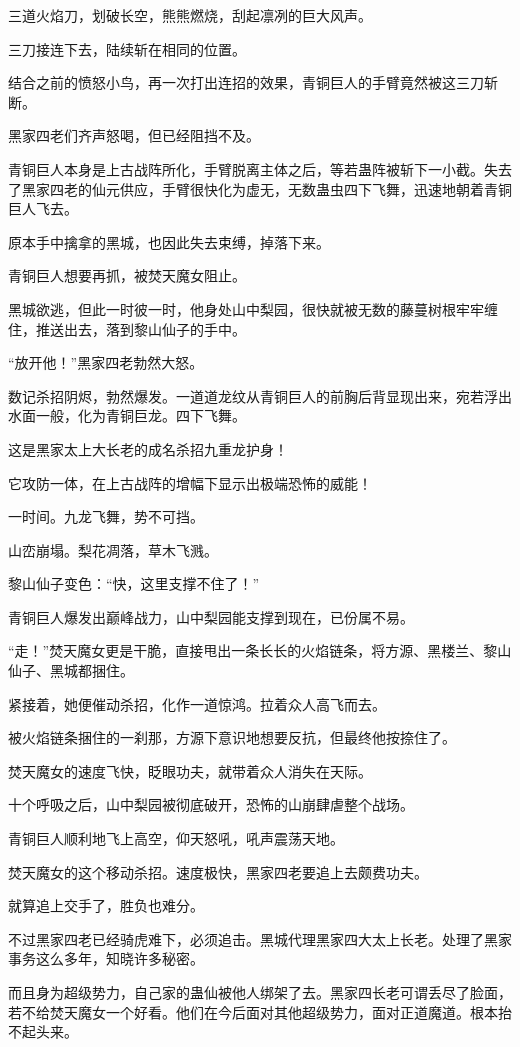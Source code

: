 \begin{this_body}
三道火焰刀，划破长空，熊熊燃烧，刮起凛冽的巨大风声。

三刀接连下去，陆续斩在相同的位置。

结合之前的愤怒小鸟，再一次打出连招的效果，青铜巨人的手臂竟然被这三刀斩断。

黑家四老们齐声怒喝，但已经阻挡不及。

青铜巨人本身是上古战阵所化，手臂脱离主体之后，等若蛊阵被斩下一小截。失去了黑家四老的仙元供应，手臂很快化为虚无，无数蛊虫四下飞舞，迅速地朝着青铜巨人飞去。

原本手中擒拿的黑城，也因此失去束缚，掉落下来。

青铜巨人想要再抓，被焚天魔女阻止。

黑城欲逃，但此一时彼一时，他身处山中梨园，很快就被无数的藤蔓树根牢牢缠住，推送出去，落到黎山仙子的手中。

“放开他！”黑家四老勃然大怒。

数记杀招阴烬，勃然爆发。一道道龙纹从青铜巨人的前胸后背显现出来，宛若浮出水面一般，化为青铜巨龙。四下飞舞。

这是黑家太上大长老的成名杀招九重龙护身！

它攻防一体，在上古战阵的增幅下显示出极端恐怖的威能！

一时间。九龙飞舞，势不可挡。

山峦崩塌。梨花凋落，草木飞溅。

黎山仙子变色：“快，这里支撑不住了！”

青铜巨人爆发出巅峰战力，山中梨园能支撑到现在，已份属不易。

“走！”焚天魔女更是干脆，直接甩出一条长长的火焰链条，将方源、黑楼兰、黎山仙子、黑城都捆住。

紧接着，她便催动杀招，化作一道惊鸿。拉着众人高飞而去。

被火焰链条捆住的一刹那，方源下意识地想要反抗，但最终他按捺住了。

焚天魔女的速度飞快，眨眼功夫，就带着众人消失在天际。

十个呼吸之后，山中梨园被彻底破开，恐怖的山崩肆虐整个战场。

青铜巨人顺利地飞上高空，仰天怒吼，吼声震荡天地。

焚天魔女的这个移动杀招。速度极快，黑家四老要追上去颇费功夫。

就算追上交手了，胜负也难分。

不过黑家四老已经骑虎难下，必须追击。黑城代理黑家四大太上长老。处理了黑家事务这么多年，知晓许多秘密。

而且身为超级势力，自己家的蛊仙被他人绑架了去。黑家四长老可谓丢尽了脸面，若不给焚天魔女一个好看。他们在今后面对其他超级势力，面对正道魔道。根本抬不起头来。


\end{this_body}
